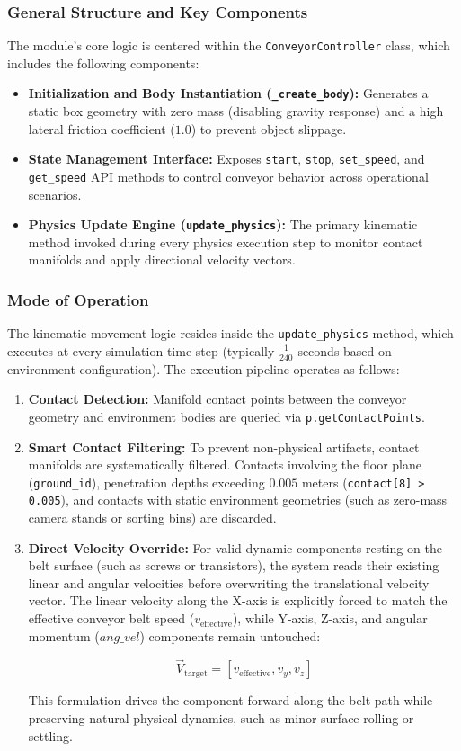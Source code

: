 \documentclass{article}
\begin{document}
\subsubsection{General Structure and Key Components}
The module's core logic is centered within the \texttt{ConveyorController} class, which includes the following components:

\begin{itemize}
	\item \textbf{Initialization and Body Instantiation (\texttt{\_create\_body}):} Generates a static box geometry with zero mass (disabling gravity response) and a high lateral friction coefficient ($1.0$) to prevent object slippage.
	\item \textbf{State Management Interface:} Exposes \texttt{start}, \texttt{stop}, \texttt{set\_speed}, and \texttt{get\_speed} API methods to control conveyor behavior across operational scenarios.
	\item \textbf{Physics Update Engine (\texttt{update\_physics}):} The primary kinematic method invoked during every physics execution step to monitor contact manifolds and apply directional velocity vectors.
\end{itemize}

\subsubsection{Mode of Operation}
The kinematic movement logic resides inside the \texttt{update\_physics} method, which executes at every simulation time step (typically $\frac{1}{240}$ seconds based on environment configuration). The execution pipeline operates as follows:

\begin{enumerate}
	\item \textbf{Contact Detection:} Manifold contact points between the conveyor geometry and environment bodies are queried via \texttt{p.getContactPoints}.
	\item \textbf{Smart Contact Filtering:} To prevent non-physical artifacts, contact manifolds are systematically filtered. Contacts involving the floor plane (\texttt{ground\_id}), penetration depths exceeding $0.005$ meters (\texttt{contact[8] > 0.005}), and contacts with static environment geometries (such as zero-mass camera stands or sorting bins) are discarded.
	\item \textbf{Direct Velocity Override:} For valid dynamic components resting on the belt surface (such as screws or transistors), the system reads their existing linear and angular velocities before overwriting the translational velocity vector. The linear velocity along the X-axis is explicitly forced to match the effective conveyor belt speed ($v_{\text{effective}}$), while Y-axis, Z-axis, and angular momentum ($ang\_vel$) components remain untouched:
	
	$$\vec{V}_{\text{target}} = [v_{\text{effective}}, v_y, v_z]$$
	
	This formulation drives the component forward along the belt path while preserving natural physical dynamics, such as minor surface rolling or settling.
\end{enumerate}
\end{document}
